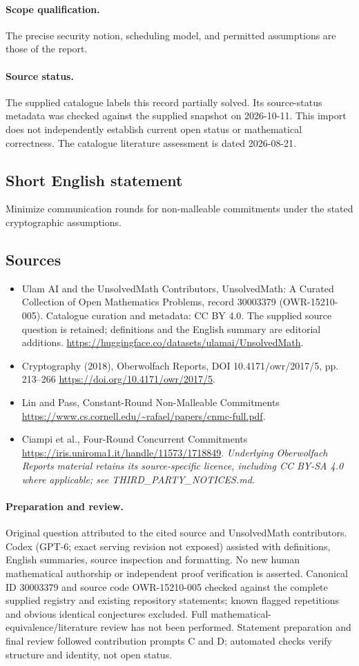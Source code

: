 \documentclass[11pt]{article}
\begin{document}
\paragraph{Scope qualification.}
The precise security notion, scheduling model, and permitted assumptions are those of the report.
\paragraph{Source status.}
The supplied catalogue labels this record partially solved. Its source-status metadata was checked against the supplied snapshot on 2026-10-11. This import does not independently establish current open status or mathematical correctness. The catalogue literature assessment is dated 2026-08-21.
\subsection{Short English statement}
Minimize communication rounds for non-malleable commitments under the stated cryptographic assumptions.
\subsection{Sources}
\begin{itemize}
\item[S1] Ulam AI and the UnsolvedMath Contributors, UnsolvedMath: A Curated Collection of Open Mathematics Problems, record 30003379 (OWR-15210-005). Catalogue curation and metadata: CC BY 4.0. The supplied source question is retained; definitions and the English summary are editorial additions.
\url{https://huggingface.co/datasets/ulamai/UnsolvedMath}.
\item[S2] Cryptography (2018), Oberwolfach Reports, DOI 10.4171/owr/2017/5, pp. 213--266
\url{https://doi.org/10.4171/owr/2017/5}.
\item[S3] Lin and Pass, Constant-Round Non-Malleable Commitments
\url{https://www.cs.cornell.edu/~rafael/papers/cnmc-full.pdf}.
\item[S4] Ciampi et al., Four-Round Concurrent Commitments
\url{https://iris.uniroma1.it/handle/11573/1718849}.
\textit{Underlying Oberwolfach Reports material retains its source-specific licence, including CC BY-SA 4.0 where applicable; see THIRD\_PARTY\_NOTICES.md.}
\end{itemize}
\paragraph{Preparation and review.}
Original question attributed to the cited source and UnsolvedMath contributors. Codex (GPT-6; exact serving revision not exposed) assisted with definitions, English summaries, source inspection and formatting. No new human mathematical authorship or independent proof verification is asserted. Canonical ID 30003379 and source code OWR-15210-005 checked against the complete supplied registry and existing repository statements; known flagged repetitions and obvious identical conjectures excluded. Full mathematical-equivalence/literature review has not been performed. Statement preparation and final review followed contribution prompts C and D; automated checks verify structure and identity, not open status.
\label{end:30003379}
\end{document}
